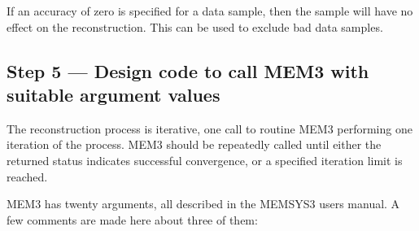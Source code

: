 If an accuracy of zero is specified for a data sample, then the sample will
have  no effect on the reconstruction. This can be used to exclude bad data
samples.


\subsection {Step 5 --- Design code to call MEM3 with suitable argument values}
The reconstruction process is iterative, one call to routine MEM3 performing 
one iteration of the process. MEM3 should be repeatedly called until either 
the returned status indicates successful convergence, or a specified iteration 
limit is reached.

MEM3 has twenty arguments, all described in the MEMSYS3 users manual. A few 
comments are made here about three of them:

